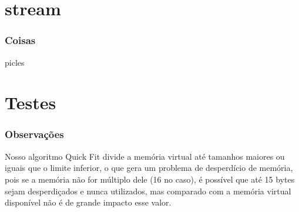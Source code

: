 \documentclass{beamer}
\begin{document}
\section{stream}

\begin{frame}
  \frametitle{Coisas}
	picles
\end{frame}

\section{Testes}

\begin{frame}
  \frametitle{Observações}
  Nosso algoritmo Quick Fit divide a memória virtual até tamanhos maiores ou iguais que o limite inferior, o que gera um problema de desperdício de memória, pois se a memória não for múltiplo dele (16 no caso),
  é possível que até 15 bytes sejam desperdiçados e nunca utilizados, mas comparado com a memória virtual disponível não é de grande impacto esse valor.
\end{frame}

\end{document}
